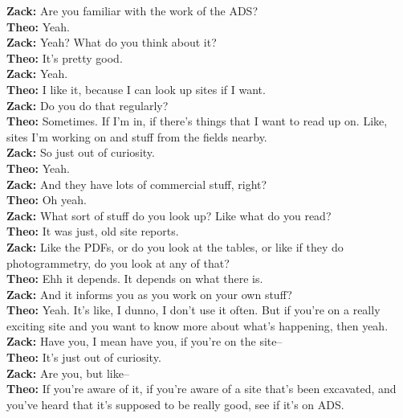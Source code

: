 \begin{arefs}
\item\label{A19}
\textbf{Zack:} Are you familiar with the work of the ADS?\\
\textbf{Theo:} Yeah.\\
\textbf{Zack:} Yeah? What do you think about it?\\
\textbf{Theo:} It's pretty good.\\
\textbf{Zack:} Yeah.\\
\textbf{Theo:} I like it, because I can look up sites if I want.\\
\textbf{Zack:} Do you do that regularly?\\
\textbf{Theo:} Sometimes. If I'm in, if there's things that I want to read up on. Like, sites I'm working on and stuff from the fields nearby.\\
\textbf{Zack:} So just out of curiosity.\\
\textbf{Theo:} Yeah.\\
\textbf{Zack:} And they have lots of commercial stuff, right?\\
\textbf{Theo:} Oh yeah.\\
\textbf{Zack:} What sort of stuff do you look up? Like what do you read?\\
\textbf{Theo:} It was just, old site reports.\\
\textbf{Zack:} Like the PDFs, or do you look at the tables, or like if they do photogrammetry, do you look at any of that?\\
\textbf{Theo:} Ehh it depends. It depends on what there is.\\
\textbf{Zack:} And it informs you as you work on your own stuff?\\
\textbf{Theo:} Yeah. It's like, I dunno, I don't use it often. But if you're on a really exciting site and you want to know more about what's happening, then yeah.\\
\textbf{Zack:} Have you, I mean have you, if you're on the site--\\
\textbf{Theo:} It's just out of curiosity.\\
\textbf{Zack:} Are you, but like--\\
\textbf{Theo:} If you're aware of it, if you're aware of a site that's been excavated, and you've heard that it's supposed to be really good, see if it's on ADS.


\end{arefs}
